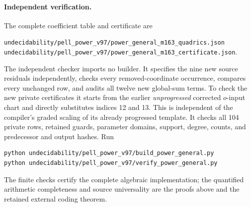 \paragraph{Independent verification.}
The complete coefficient table and certificate are
\begin{center}\small
\nolinkurl{undecidability/pell_power_v97/power_general_m163_quadrics.json}\\
\nolinkurl{undecidability/pell_power_v97/power_general_m163_certificate.json}.
\end{center}
The independent checker imports no builder. It specifies the nine
new source residuals independently, checks every removed-coordinate
occurrence, compares every unchanged row, and audits all twelve new
global-sum terms. To check the new private certificates it starts
from the earlier \emph{unprogressed} corrected \(o\)-input chart
and directly substitutes indices 12 and 13. This is independent of
the compiler's graded scaling of its already progressed template.
It checks all 104 private rows, retained guards, parameter domains,
support, degree, counts, and predecessor and output hashes. Run
\begin{verbatim}
python undecidability/pell_power_v97/build_power_general.py
python undecidability/pell_power_v97/verify_power_general.py
\end{verbatim}
The finite checks certify the complete algebraic implementation;
the quantified arithmetic completeness and source universality are
the proofs above and the retained external coding theorem.

